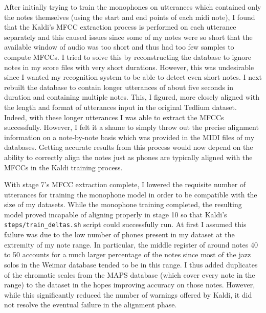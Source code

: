 \documentclass[conference]{IEEEtran}
\begin{document}
After initially trying to train the monophones on utterances which contained only the notes themselves (using the start and end points of each midi note), I found that the Kaldi's MFCC extraction process is performed on each utterance separately and this caused issues since some of my notes were so short that the available window of audio was too short and thus had too few samples to compute MFCCs. I tried to solve this by reconstructing the database to ignore notes in my score files with very short durations. However, this was undesirable since I wanted my recognition system to be able to detect even short notes. I next rebuilt the database to contain longer utterances of about five seconds in duration and containing multiple notes. This, I figured, more closely aligned with the length and format of utterances input in the original Tedlium dataset. Indeed, with these longer utterances I was able to extract the MFCCs successfully. However, I felt it a shame to simply throw out the precise alignment information on a note-by-note basis which was provided in the MIDI files of my databases. Getting accurate results from this process would now depend on the ability to correctly align the notes just as phones are typically aligned with the MFCCs in the Kaldi training process.

With stage 7's MFCC extraction complete, I lowered the requisite number of utterances for training the monophone model  in order to be compatible with the size of my datasets. While the monophone training completed, the resulting model proved incapable of aligning properly in stage 10 so that Kaldi's \texttt{steps/train\_deltas.sh} script could successfully run. At first I assumed this failure was due to the low number of phones present in my dataset at the extremity of my note range. In particular, the middle register of around notes 40 to 50 accounts for a much larger percentage of the notes since most of the jazz solos in the Weimar database tended to be in this range. I thus added duplicates of the chromatic scales from the MAPS database (which cover every note in the range) to the dataset in the hopes improving accuracy on those notes. However, while this significantly reduced the number of warnings offered by Kaldi, it did not resolve the eventual failure in the alignment phase.
\end{document}
